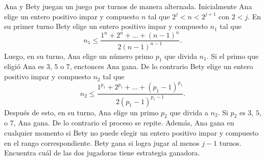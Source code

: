 Ana y Bety juegan un juego por turnos de manera alternada. Inicialmente Ana elige un entero positivo impar y compuesto $n$ tal que $2^j\lt n\lt 2^{j+1}$ con $2\lt j$. En su primer turno Bety elige un entero positivo impar y compuesto $n_1$ tal que \[n_1\leq \frac{1^n+2^n+\dots+(n-1)^n}{2(n-1)^{n-1}}.\]
Luego, en su turno, Ana elige un número primo $p_1$ que divida $n_1$. Si el primo que eligió Ana es $3$, $5$ o $7$, enctonces Ana gana. De lo contrario Bety elige un entero positivo impar y compuesto $n_2$ tal que 
\[n_2\leq \frac{1^{p_1}+2^{p_1}+\dots+(p_1-1)^{p_1}}{2(p_1-1)^{p_1-1}}.\]
Después de esto, en su turno, Ana elige un primo $p_2$ que divida a $n_2$. Si $p_2$ es $3$, $5$, o $7$, Ana gana. De lo contrario el proceso se repite. Además, Ana gana en cualquier momento si Bety no puede elegir un entero positivo impar y compuesto en el rango correspondiente. Bety gana si logra jugar al menos $j-1$ turnos. Encuentra cuál de las dos jugadoras tiene estrategia ganadora.